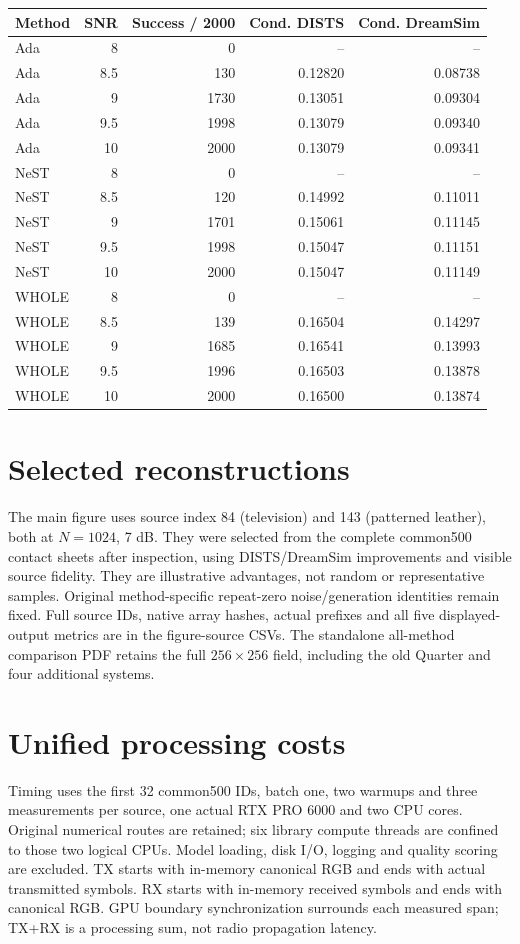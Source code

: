 \documentclass[10pt,letterpaper]{article}
\begin{document}
\begin{longtable}{@{}lrrrr@{}}\toprule
Method & SNR & Success / 2000 & Cond. DISTS & Cond. DreamSim\\\midrule\endhead
Ada & 8 & 0 & -- & --\\
Ada & 8.5 & 130 & 0.12820 & 0.08738\\
Ada & 9 & 1730 & 0.13051 & 0.09304\\
Ada & 9.5 & 1998 & 0.13079 & 0.09340\\
Ada & 10 & 2000 & 0.13079 & 0.09341\\
NeST & 8 & 0 & -- & --\\
NeST & 8.5 & 120 & 0.14992 & 0.11011\\
NeST & 9 & 1701 & 0.15061 & 0.11145\\
NeST & 9.5 & 1998 & 0.15047 & 0.11151\\
NeST & 10 & 2000 & 0.15047 & 0.11149\\
WHOLE & 8 & 0 & -- & --\\
WHOLE & 8.5 & 139 & 0.16504 & 0.14297\\
WHOLE & 9 & 1685 & 0.16541 & 0.13993\\
WHOLE & 9.5 & 1996 & 0.16503 & 0.13878\\
WHOLE & 10 & 2000 & 0.16500 & 0.13874\\
\bottomrule\end{longtable}


\section{Selected reconstructions}
The main figure uses source index 84 (television) and 143 (patterned leather), both at $N=1024$, 7 dB. They were selected from the complete common500 contact sheets after inspection, using DISTS/DreamSim improvements and visible source fidelity. They are illustrative advantages, not random or representative samples. Original method-specific repeat-zero noise/generation identities remain fixed. Full source IDs, native array hashes, actual prefixes and all five displayed-output metrics are in the figure-source CSVs. The standalone all-method comparison PDF retains the full $256\times256$ field, including the old Quarter and four additional systems.

\section{Unified processing costs}
Timing uses the first 32 common500 IDs, batch one, two warmups and three measurements per source, one actual RTX PRO 6000 and two CPU cores. Original numerical routes are retained; six library compute threads are confined to those two logical CPUs. Model loading, disk I/O, logging and quality scoring are excluded. TX starts with in-memory canonical RGB and ends with actual transmitted symbols. RX starts with in-memory received symbols and ends with canonical RGB. GPU boundary synchronization surrounds each measured span; TX+RX is a processing sum, not radio propagation latency.
\end{document}
